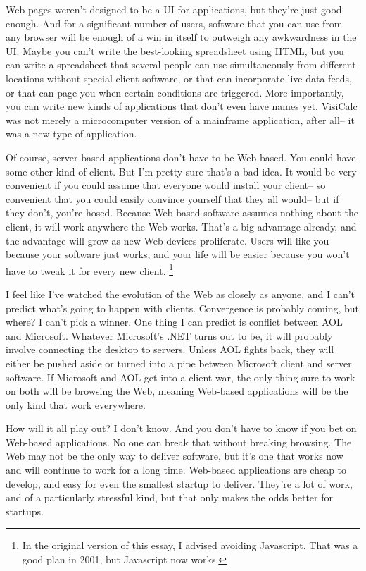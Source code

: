 Web pages weren't designed to be a UI for applications, but they're just
good enough. And for a significant number of users, software that you
can use from any browser will be enough of a win in itself to outweigh
any awkwardness in the UI. Maybe you can't write the best-looking
spreadsheet using HTML, but you can write a spreadsheet that several
people can use simultaneously from different locations without special
client software, or that can incorporate live data feeds, or that can
page you when certain conditions are triggered. More importantly, you
can write new kinds of applications that don't even have names yet.
VisiCalc was not merely a microcomputer version of a mainframe
application, after all-- it was a new type of application.

Of course, server-based applications don't have to be Web-based. You
could have some other kind of client. But I'm pretty sure that's a bad
idea. It would be very convenient if you could assume that everyone
would install your client-- so convenient that you could easily convince
yourself that they all would-- but if they don't, you're hosed. Because
Web-based software assumes nothing about the client, it will work
anywhere the Web works. That's a big advantage already, and the
advantage will grow as new Web devices proliferate. Users will like you
because your software just works, and your life will be easier because
you won't have to tweak it for every new client. \footnote{In the original version of this essay, I advised avoiding
Javascript. That was a good plan in 2001, but Javascript now works.}

I feel like I've watched the evolution of the Web as closely as anyone,
and I can't predict what's going to happen with clients. Convergence is
probably coming, but where? I can't pick a winner. One thing I can
predict is conflict between AOL and Microsoft. Whatever Microsoft's .NET
turns out to be, it will probably involve connecting the desktop to
servers. Unless AOL fights back, they will either be pushed aside or
turned into a pipe between Microsoft client and server software. If
Microsoft and AOL get into a client war, the only thing sure to work on
both will be browsing the Web, meaning Web-based applications will be
the only kind that work everywhere.

How will it all play out? I don't know. And you don't have to know if
you bet on Web-based applications. No one can break that without
breaking browsing. The Web may not be the only way to deliver software,
but it's one that works now and will continue to work for a long time.
Web-based applications are cheap to develop, and easy for even the
smallest startup to deliver. They're a lot of work, and of a
particularly stressful kind, but that only makes the odds better for
startups.

